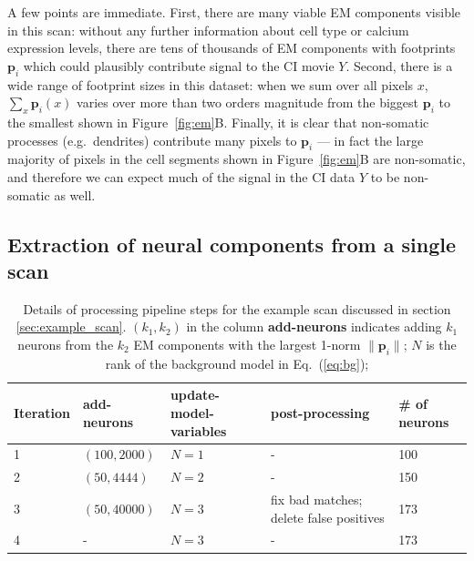 \documentclass[10pt,letterpaper]{article}
\begin{document}
A few points are immediate.  First, there are many viable EM components visible in this scan: without any further information about cell type or calcium expression levels, there are tens of thousands of EM components with footprints $\bm{p}_i$ which could plausibly contribute signal to the CI movie $Y$.  Second, there is a wide range of footprint sizes in this dataset: when we sum over all pixels $x$, $\sum_x \bm{p}_i(x)$ varies over more than two orders magnitude from the biggest $\bm{p}_i$ to the smallest shown in Figure~\ref{fig:em}B.  Finally, it is clear that non-somatic processes (e.g.~dendrites) contribute many pixels to $\bm{p}_i$ --- in fact the large majority of pixels in the cell segments shown in Figure~\ref{fig:em}B are non-somatic, and therefore we can expect much of the signal in the CI data $Y$ to be non-somatic as well.

\subsection{Extraction of neural components from a single scan}
\label{sec:one_scan}

\label{sec:example_scan}

\begin{table}
	\centering 
	\begin{tabular}{lllll}
	\toprule
	\cmidrule{1-2}
	Iteration  & add-neurons &update-model-variables  & post-processing  & \# of neurons \\
	\hline
	\hline 
	1 & $(100, 2000)$ & $ N= 1$ & - & 100\\
	\midrule
	2 & $(50, 4444)$ & $ N= 2$ & - & 150 \\
	\midrule 
	3 & $(50, 40000)$ & $ N= 3$ & fix bad matches; delete false positives& 173\\
	4 & -& $ N= 3$ & - &173 \\

	 \bottomrule
	\end{tabular}
	\caption{Details of processing pipeline steps for the example scan discussed in section \ref{sec:example_scan}. $(k_1, k_2)$ in the column \textbf{add-neurons} indicates adding $k_1$ neurons from the $k_2$ EM components with the largest 1-norm $\|\bm{p}_i\|$; $N$ is the rank of the background model in Eq.~(\ref{eq:bg});
	} 
\label{table:pipeline}	
\end{table}
\end{document}
